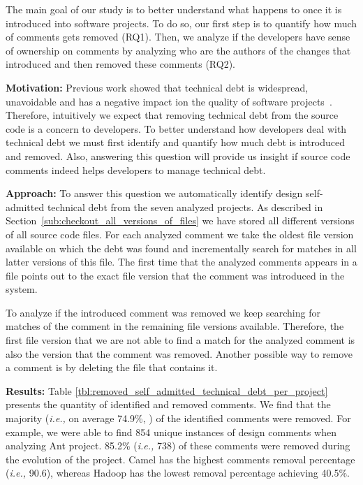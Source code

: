 The main goal of our study is to better understand what happens to \SATD once it is introduced into software projects. To do so, our first step is to quantify how much of \SATD comments gets removed (RQ1). Then, we analyze if the developers have sense of ownership on \SATD comments by analyzing who are the authors of the changes that introduced and then removed these \SATD comments (RQ2). 

\vspace{3mm}
\noindent\rqi
\vspace{3mm}

\noindent \textbf{Motivation:} Previous work showed that technical debt is widespread, unavoidable and has a negative impact ion the quality of software projects~\cite{Lim2012Software}. Therefore, intuitively we expect that removing technical debt from the source code is a concern to developers. To better understand how developers deal with technical debt we must first identify and quantify how much debt is introduced and removed. Also, answering this question will provide us insight if source code comments indeed helps developers to manage technical debt. 

\vspace{1mm}
\noindent \textbf{Approach:} To answer this question we automatically identify design self-admitted technical debt from the seven analyzed projects. As described in Section~\ref{sub:checkout_all_versions_of_files} we have stored all different versions of all source code files. For each analyzed \SATD comment we take the oldest file version available on which the debt was found and incrementally search for matches in all latter versions of this file. The first time that the analyzed \SATD comments appears in a file points out to the exact file version that the \SATD comment was introduced in the system.

To analyze if the introduced \SATD comment was removed we keep searching for matches of the comment in the remaining file versions available. Therefore, the first file version that we are not able to find a match for the analyzed comment is also the version that the \SATD comment was removed. Another possible way to remove a \SATD comment is by deleting the file that contains it. 

\vspace{1mm}
\noindent \textbf{Results:} Table \ref{tbl:removed_self_admitted_technical_debt_per_project} presents the quantity of identified and removed \SATD comments. We find that the majority (\textit{i.e.,} on average 74.9\%, ) of the identified \SATD comments were removed. For example, we were able to find 854 unique instances of design \SATD comments when analyzing Ant project. 85.2\% (\textit{i.e.,} 738) of these \SATD comments were removed during the evolution of the project. Camel has the highest \SATD comments removal percentage (\textit{i.e.,} 90.6), whereas Hadoop has the lowest removal percentage achieving 40.5\%.

